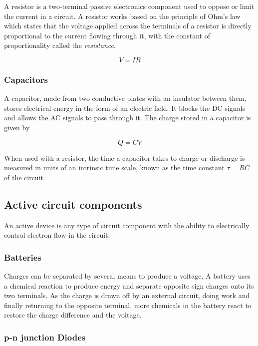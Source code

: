 A resistor is a two-terminal passive electronics component used to oppose or limit the current in a circuit. A resistor works based on the principle of Ohm’s law which states that the voltage applied across the terminals of a resistor is directly proportional to the current flowing through it, with the constant of proportionality called the \textit{resistance}.

\begin{equation*}
V = I R
\end{equation*}

\subsubsection*{Capacitors}

A capacitor, made from two conductive plates with an insulator between them, stores electrical energy in the form of an electric field. It blocks the DC signals and allows the AC signals to pass through it. The charge stored in a capacitor is given by

\begin{equation*}
Q = CV
\end{equation*}

When used with a resistor, the time a capacitor takes to charge or discharge is measured in units of an intrinsic time scale, known as the time constant $\tau = RC$ of the circuit.

\subsection*{Active circuit components}
An active device is any type of circuit component with the ability to electrically control electron flow in the circuit.

\subsubsection*{Batteries}

Charges can be separated by several means to produce a voltage. A battery uses a chemical reaction to produce energy and separate opposite sign charges onto its two terminals. As the charge is drawn off by an external circuit, doing work and finally returning to the opposite terminal, more chemicals in the battery react to restore the charge difference and the voltage.


\subsubsection*{p-n junction Diodes}

